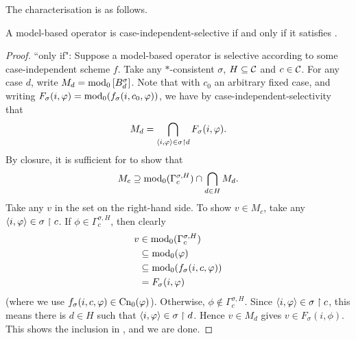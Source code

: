 The characterisation is as follows.

\begin{theorem}
    \label{thm:case_independent_selectivity_characterisation}
    A model-based operator is case-independent-selective if and only if it
    satisfies \hboundedness{}.
\end{theorem}

\begin{proof}

    ``only if": Suppose a model-based operator is selective
    according to some case-independent scheme $f$. Take any $\ast$-consistent
    $\sigma$, $H \subseteq \mathcal{C}$ and $c \in \mathcal{C}$. For any case $d$, write $M_d =
    \operatorname{mod}_0\left[{B^\sigma_d}\right]$. Note that with $c_0$ an
    arbitrary fixed case, and writing $F_\sigma(i, \varphi) =
    \operatorname{mod}_0(f_\sigma(i, c_0, \varphi))$, we have by case-independent-selectivity
    that
    \[
        M_d = \bigcap_{\langle {i, \varphi} \rangle \in \sigma \upharpoonright d}{
            F_\sigma(i, \varphi)
        }.
    \]
    By closure, it is sufficient for \hboundedness{} to show that
    \begin{equation}
        \label{eqn:hbnd_inclusion}
        M_c
        \supseteq
        \operatorname{mod}_0(\Gamma^{\sigma, H}_c) \cap \bigcap_{d \in H}{M_d}.
    \end{equation}
    Take any $v$ in the set on the right-hand side. To show $v \in M_c$, take
    any $\langle {i, \varphi} \rangle \in \sigma \upharpoonright c$. If $\phi \in \Gamma^{\sigma, H}_c$,
    then clearly
    \begin{align*}
        v
        &\in \operatorname{mod}_0(\Gamma^{\sigma, H}_c) \\
        &\subseteq \operatorname{mod}_0(\varphi) \\
        &\subseteq \operatorname{mod}_0(f_\sigma(i, c, \varphi)) \\
        &= F_\sigma(i, \varphi)
    \end{align*}
    (where we use $f_\sigma(i, c, \varphi) \in \operatorname{Cn}_0(\varphi)$). Otherwise, $\phi
    \notin \Gamma^{\sigma, H}_c$. Since $\langle {i, \varphi} \rangle \in \sigma \upharpoonright c$,
    this means there is $d \in H$ such that $\langle {i, \varphi} \rangle \in \sigma \upharpoonright d$.
    Hence $v \in M_d$ gives $v \in F_\sigma(i, \phi)$. This shows the inclusion
    in , and we are done.


\end{proof}
